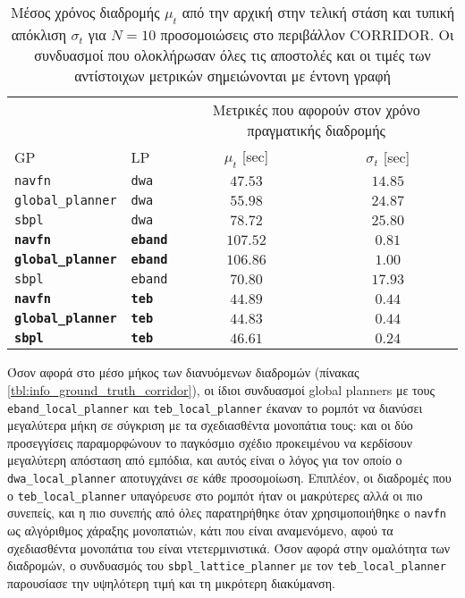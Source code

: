 \begin{table}[h]\centering
\renewcommand{\arraystretch}{1.3}
\begin{tabular}{llcc}
  & & \multicolumn{2}{c}{Μετρικές που αφορούν στον χρόνο πραγματικής διαδρομής} \\
  \cline{3-4}
  GP & LP & $\mu_{t}$ [sec] & $\sigma_{t}$ [sec] \\ \toprule
  \texttt{navfn} & \texttt{dwa} & $47.53$ & $14.85$ \\
  \texttt{global\_planner} & \texttt{dwa} & $55.98$ & $24.87$ \\
  \texttt{sbpl} & \texttt{dwa} & $78.72$ & $25.80$ \\
  \textbf{\texttt{navfn}} & \textbf{\texttt{eband}} & $\bm{107.52}$ & $\bm{0.81}$ \\
  \textbf{\texttt{global\_planner}} & \textbf{\texttt{eband}} & $\bm{106.86}$ & $\bm{1.00}$ \\
  \texttt{sbpl} & \texttt{eband} & $70.80$ & $17.93$ \\
  \textbf{\texttt{navfn}} & \textbf{\texttt{teb}} & $\bm{44.89}$ & $\bm{0.44}$ \\
  \textbf{\texttt{global\_planner}} & \textbf{\texttt{teb}} & $\bm{44.83}$ & $\bm{0.44}$ \\
  \textbf{\texttt{sbpl}} & \textbf{\texttt{teb}} & $\bm{46.61}$ & $\bm{0.24}$ \\ \bottomrule
\end{tabular}
\caption{\small Μέσος χρόνος διαδρομής $\mu_{t}$ από την αρχική στην τελική
         στάση και τυπική απόκλιση $\sigma_{t}$ για $N=10$ προσομοιώσεις στο
         περιβάλλον CORRIDOR. Οι συνδυασμοί που ολοκλήρωσαν όλες τις αποστολές
         και οι τιμές των αντίστοιχων μετρικών σημειώνονται με έντονη γραφή}
\label{tbl:info_pose_corridor}
\end{table}


Όσον αφορά στο μέσο μήκος των διανυόμενων διαδρομών
(πίνακας \ref{tbl:info_ground_truth_corridor}), οι ίδιοι συνδυασμοί global
planners με τους \texttt{eband\_local\_planner} και
\texttt{teb\_local\_planner} έκαναν το ρομπότ να διανύσει μεγαλύτερα μήκη σε
σύγκριση με τα σχεδιασθέντα μονοπάτια τους: και οι δύο προσεγγίσεις
παραμορφώνουν το παγκόσμιο σχέδιο προκειμένου να κερδίσουν μεγαλύτερη απόσταση
από εμπόδια, και αυτός είναι ο λόγος για τον οποίο ο
\texttt{dwa\_local\_planner} αποτυγχάνει σε κάθε προσομοίωση. Επιπλέον, οι
διαδρομές που ο \texttt{teb\_local\_planner} υπαγόρευσε στο ρομπότ ήταν οι
μακρύτερες αλλά οι πιο συνεπείς, και η πιο συνεπής από όλες παρατηρήθηκε όταν
χρησιμοποιήθηκε ο \texttt{navfn} ως αλγόριθμος χάραξης μονοπατιών, κάτι που
είναι αναμενόμενο, αφού τα σχεδιασθέντα μονοπάτια του είναι ντετερμινιστικά.
Όσον αφορά στην ομαλότητα των διαδρομών, ο συνδυασμός του
\texttt{sbpl\_lattice\_planner} με τον \texttt{teb\_local\_planner} παρουσίασε
την υψηλότερη τιμή και τη μικρότερη διακύμανση.


